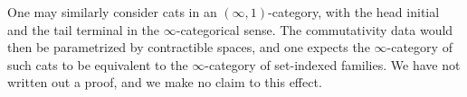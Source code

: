 \begin{remark}\label{rem:infinity}
One may similarly consider cats in an $(\infty,1)$-category, with the head
initial and the tail terminal in the $\infty$-categorical sense. The
commutativity data would then be parametrized by contractible spaces, and one
expects the $\infty$-category of such cats to be equivalent to the
$\infty$-category of set-indexed families. We have not written out a proof, and
we make no claim to this effect.
\end{remark}
